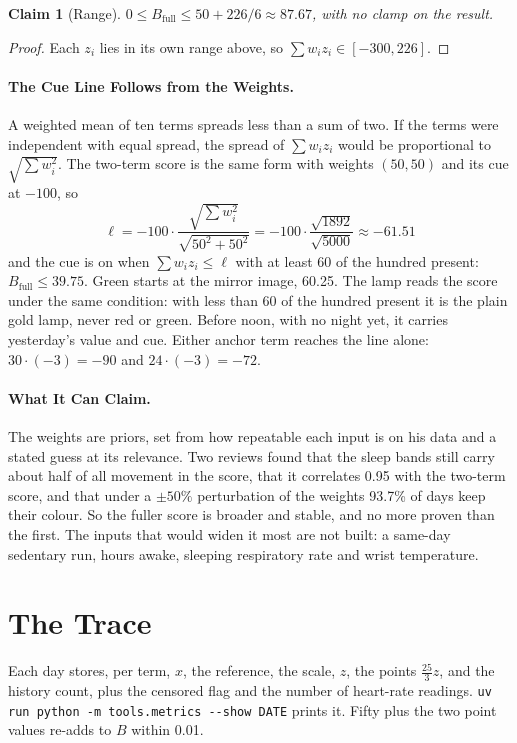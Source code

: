\documentclass[11pt]{article}
\newtheorem{claim}{Claim}
\begin{document}
\begin{claim}[Range]
$0 \le B_{\text{full}} \le 50 + 226/6 \approx 87.67$, with no clamp on the result.
\end{claim}
\begin{proof}
Each $z_i$ lies in its own range above, so $\sum w_i z_i \in [-300, 226]$.
\end{proof}

\paragraph{The Cue Line Follows from the Weights.} A weighted mean of ten terms
spreads less than a sum of two. If the terms were independent with equal spread,
the spread of $\sum w_i z_i$ would be proportional to $\sqrt{\sum w_i^2}$. The
two-term score is the same form with weights $(50, 50)$ and its cue at $-100$, so
\begin{equation}
\ell = -100 \cdot \frac{\sqrt{\sum w_i^2}}{\sqrt{50^2 + 50^2}} = -100 \cdot
\frac{\sqrt{1892}}{\sqrt{5000}} \approx -61.51
\end{equation}
and the cue is on when $\sum w_i z_i \le \ell$ with at least 60 of the hundred
present: $B_{\text{full}} \le 39.75$. Green starts at the mirror image, 60.25.
The lamp reads the score under the same condition: with less than 60 of the
hundred present it is the plain gold lamp, never red or green. Before noon, with
no night yet, it carries yesterday's value and cue.
Either anchor term reaches the line alone: $30 \cdot (-3) = -90$ and
$24 \cdot (-3) = -72$.

\paragraph{What It Can Claim.} The weights are priors, set from how repeatable
each input is on his data and a stated guess at its relevance. Two reviews found
that the sleep bands still carry about half of all movement in the score, that it
correlates 0.95 with the two-term score, and that under a $\pm 50\%$ perturbation
of the weights 93.7\% of days keep their colour. So the fuller score is broader
and stable, and no more proven than the first. The inputs that would widen it
most are not built: a same-day sedentary run, hours awake, sleeping respiratory
rate and wrist temperature.

\section{The Trace}
Each day stores, per term, $x$, the reference, the scale, $z$, the points
$\tfrac{25}{3} z$, and the history count, plus the censored flag and the number
of heart-rate readings. \texttt{uv run python -m tools.metrics -{}-show DATE}
prints it. Fifty plus the two point values re-adds to $B$ within 0.01.
\end{document}
